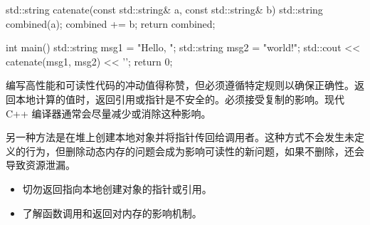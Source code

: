 
\begin{cpp}
std::string catenate(const std::string& a, const std::string& b) {
  std::string combined(a);
  combined += b;
  return combined;
}

int main() {
  std::string msg1 = "Hello, ";
  std::string msg2 = "world!";
  std::cout << catenate(msg1, msg2) << '\n';
  return 0;
}
\end{cpp}

编写高性能和可读性代码的冲动值得称赞，但必须遵循特定规则以确保正确性。返回本地计算的值时，返回引用或指针是不安全的。必须接受复制的影响。现代 C++ 编译器通常会尽量减少或消除这种影响。

另一种方法是在堆上创建本地对象并将指针传回给调用者。这种方式不会发生未定义的行为，但删除动态内存的问题会成为影响可读性的新问题，如果不删除，还会导致资源泄漏。


\begin{itemize}
\item
切勿返回指向本地创建对象的指针或引用。

\item
了解函数调用和返回对内存的影响机制。
\end{itemize}

















